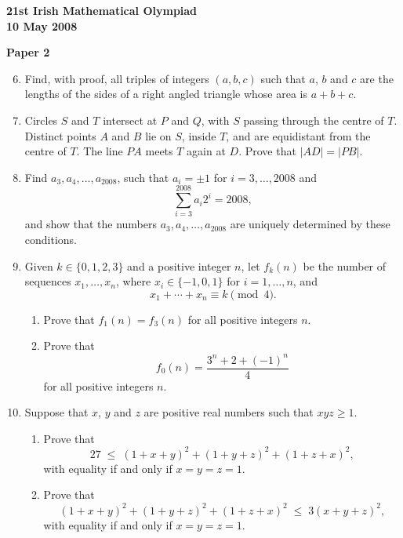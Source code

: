 \documentclass[12pt]{article}
\begin{document}
\newpage
\begin{center}
{\large\bfseries 21st Irish Mathematical Olympiad\\10 May 2008}
\end{center}
\bigskip\noindent\textbf{Paper 2}\bigskip
\begin{enumerate}
\setcounter{enumi}{5}
\item Find, with proof, all triples of integers $(a,b,c)$ such that $a$, $b$ and $c$ are the lengths of the sides of a right angled triangle whose area is $a + b + c$.

\item Circles $S$ and $T$ intersect at $P$ and $Q$, with $S$ passing through the centre of $T$. Distinct points $A$ and $B$ lie on $S$, inside $T$, and are equidistant from the centre of $T$. The line $PA$ meets $T$ again at $D$. Prove that $|AD| = |PB|$.

\item Find $a_3, a_4, \ldots, a_{2008}$, such that $a_i = \pm 1$ for $i = 3, \ldots, 2008$ and
\[
\sum_{i=3}^{2008} a_i 2^i = 2008,
\]
and show that the numbers $a_3, a_4, \ldots, a_{2008}$ are uniquely determined by these conditions.

\item Given $k \in \{0,1,2,3\}$ and a positive integer $n$, let $f_k(n)$ be the number of sequences $x_1, \ldots, x_n$, where $x_i \in \{-1, 0, 1\}$ for $i = 1, \ldots, n$, and
\[
x_1 + \cdots + x_n \equiv k \pmod{4}.
\]

\begin{enumerate}
\item Prove that $f_1(n) = f_3(n)$ for all positive integers $n$.

\item Prove that
\[
f_0(n) = \frac{3^n + 2 + (-1)^n}{4}
\]
for all positive integers $n$.
\end{enumerate}

\item Suppose that $x$, $y$ and $z$ are positive real numbers such that $xyz \ge 1$.

\begin{enumerate}
\item Prove that
\[
27 \;\le\; (1+x+y)^2 + (1+y+z)^2 + (1+z+x)^2,
\]
with equality if and only if $x = y = z = 1$.

\item Prove that
\[
(1+x+y)^2 + (1+y+z)^2 + (1+z+x)^2 \;\le\; 3(x+y+z)^2,
\]
with equality if and only if $x = y = z = 1$.
\end{enumerate}
\end{enumerate}
\end{document}
